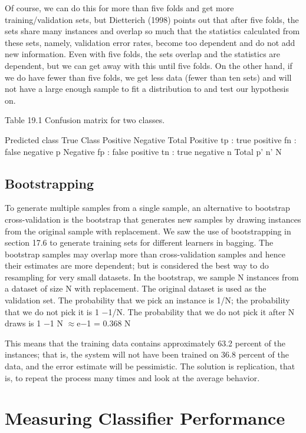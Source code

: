 Of course, we can do this for more than five folds and get more training/validation sets, but Dietterich (1998) points out that after five folds, the sets share many instances and overlap so much that the statistics calculated from these sets, namely, validation error rates, become too dependent and do not add new information. Even with five folds, the sets overlap and the statistics are dependent, but we can get away with this until five folds. On the other hand, if we do have fewer than five folds, we get less data (fewer than ten sets) and will not have a large enough sample to fit a distribution to and test our hypothesis on.

Table 19.1 Confusion matrix for two classes.

Predicted class True Class Positive Negative Total Positive tp : true positive fn : false negative p Negative fp : false positive tn : true negative n Total p' n' N

\subsection{Bootstrapping}

To generate multiple samples from a single sample, an alternative to bootstrap cross-validation is the bootstrap that generates new samples by drawing instances from the original sample with replacement. We saw the use of bootstrapping in section 17.6 to generate training sets for different learners in bagging. The bootstrap samples may overlap more than cross-validation samples and hence their estimates are more dependent; but is considered the best way to do resampling for very small datasets. In the bootstrap, we sample N instances from a dataset of size N with replacement. The original dataset is used as the validation set. The probability that we pick an instance is 1/N; the probability that we do not pick it is 1 $-$1/N. The probability that we do not pick it after N draws is 1 $-$1 N $\approx$e$-$1 = 0.368 N

This means that the training data contains approximately 63.2 percent of the instances; that is, the system will not have been trained on 36.8 percent of the data, and the error estimate will be pessimistic. The solution is replication, that is, to repeat the process many times and look at the average behavior.

\section{Measuring Classifier Performance}

